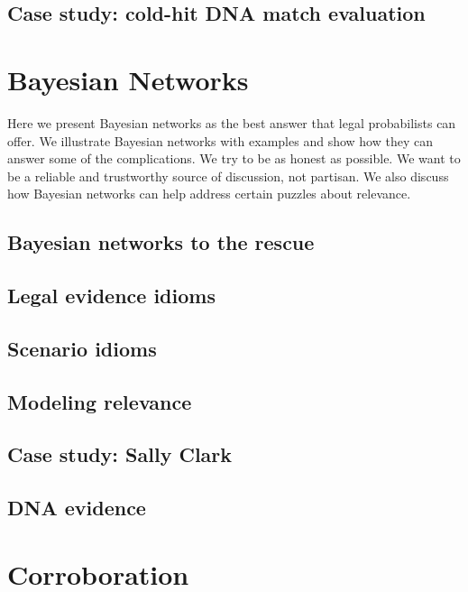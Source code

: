 \documentclass[]{book}
\begin{document}
\section{Case study: cold-hit DNA match evaluation}

\chapter{Bayesian Networks}

Here we present Bayesian networks
as the best answer that legal probabilists
can offer. We illustrate Bayesian networks
with examples and show how they can answer
some of the complications. We try to be
as honest as possible. We want to be a reliable and trustworthy
source of discussion, not partisan. We also discuss
how Bayesian networks can help address certain
puzzles about relevance.

\section{Bayesian networks to the rescue}

\section{Legal evidence idioms}

\section{Scenario idioms}

\section{Modeling relevance}

\section{Case study: Sally Clark}


\section{DNA evidence}


\chapter{Corroboration}
\end{document}
